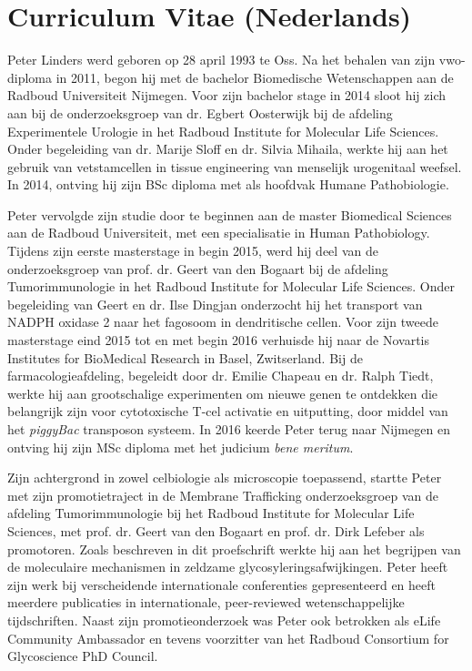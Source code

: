 \clearpage

\section{Curriculum Vitae (Nederlands)}

Peter Linders werd geboren op 28 april 1993 te Oss. Na het behalen van zijn vwo-diploma in 2011, begon hij met de bachelor Biomedische Wetenschappen aan de Radboud Universiteit Nijmegen. Voor zijn bachelor stage in 2014 sloot hij zich aan bij de onderzoeksgroep van dr. Egbert Oosterwijk bij de afdeling Experimentele Urologie in het Radboud Institute for Molecular Life Sciences. Onder begeleiding van dr. Marije Sloff en dr. Silvia Mihaila, werkte hij aan het gebruik van vetstamcellen in tissue engineering van menselijk urogenitaal weefsel. In 2014, ontving hij zijn BSc diploma met als hoofdvak Humane Pathobiologie.

Peter vervolgde zijn studie door te beginnen aan de master Biomedical Sciences aan de Radboud Universiteit, met een specialisatie in Human Pathobiology. Tijdens zijn eerste masterstage in begin 2015, werd hij deel van de onderzoeksgroep van prof. dr. Geert van den Bogaart bij de afdeling Tumorimmunologie in het Radboud Institute for Molecular Life Sciences. Onder begeleiding van Geert en dr. Ilse Dingjan onderzocht hij het transport van NADPH oxidase 2 naar het fagosoom in dendritische cellen. Voor zijn tweede masterstage eind 2015 tot en met begin 2016 verhuisde hij naar de Novartis Institutes for BioMedical Research in Basel, Zwitserland. Bij de farmacologieafdeling, begeleidt door dr. Emilie Chapeau en dr. Ralph Tiedt, werkte hij aan grootschalige experimenten om nieuwe genen te ontdekken die belangrijk zijn voor cytotoxische T-cel activatie en uitputting, door middel van het \emph{piggyBac} transposon systeem. In 2016 keerde Peter terug naar Nijmegen en ontving hij zijn MSc diploma met het judicium \emph{bene meritum}.

Zijn achtergrond in zowel celbiologie als microscopie toepassend, startte Peter met zijn promotietraject in de Membrane Trafficking onderzoeksgroep van de afdeling Tumorimmunologie bij het Radboud Institute for Molecular Life Sciences, met prof. dr. Geert van den Bogaart en prof. dr. Dirk Lefeber als promotoren. Zoals beschreven in dit proefschrift werkte hij aan het begrijpen van de moleculaire mechanismen in zeldzame glycosyleringsafwijkingen. Peter heeft zijn werk bij verscheidende internationale conferenties gepresenteerd en heeft meerdere publicaties in internationale, peer-reviewed wetenschappelijke tijdschriften. Naast zijn promotieonderzoek was Peter ook betrokken als eLife Community Ambassador en tevens voorzitter van het Radboud Consortium for Glycoscience PhD Council.


